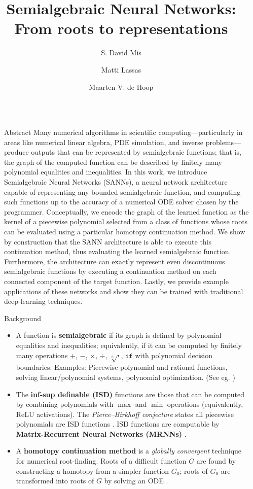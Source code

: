\documentclass[final]{beamer}
\title{Semialgebraic Neural Networks: From roots to representations}
\author{S. David Mis \inst{1} \and Matti Lassas \inst{2} \and Maarten V. de Hoop \inst{1}}
\institute[shortinst]{\inst{1} Rice University \samelineand \inst{2} University of Helsinki}
\newlength{\sepwidth}
\newlength{\lrcolwidth}
\newcommand{\separatorcolumn}{\begin{column}{\sepwidth}\end{column}}
\begin{document}
\begin{frame}[t]
\begin{columns}[t]
\separatorcolumn

\begin{column}{\lrcolwidth}

  \begin{exampleblock}{Abstract}
    Many numerical algorithms in scientific computing---particularly in areas like numerical linear algebra, PDE simulation, and inverse problems---produce outputs that can be represented by semialgebraic functions; that is, the graph of the computed function can be described by finitely many polynomial equalities and inequalities. 
    In this work, we introduce Semialgebraic Neural Networks (SANNs), a neural network architecture capable of representing any bounded semialgebraic function, and computing such functions up to the accuracy of a numerical ODE solver chosen by the programmer.
    Conceptually, we encode the graph of the learned function as the kernel of a piecewise polynomial selected from a class of functions whose roots can be evaluated using a particular homotopy continuation method.
    We show by construction that the SANN architecture is able to execute this continuation method, thus evaluating the learned semialgebraic function.
    Furthermore, the architecture can exactly represent even discontinuous semialgebraic functions by executing a continuation method on each connected component of the target function.
    Lastly, we provide example applications of these networks and show they can be trained with traditional deep-learning techniques.
  \end{exampleblock}

  \begin{block}{Background}
    \begin{itemize}
      \item A function is \textbf{semialgebraic} if its graph is defined by polynomial equalities and inequalities; equivalently, if it can be computed by finitely many operations $+$, $-$, $\times$, $\div$, $\sqrt[n]{\cdot}$, $\texttt{if}$ with polynomial decision boundaries. Examples: Piecewise polynomial and rational functions, solving linear/polynomial systems, polynomial optimization. (See eg. \cite{bochnakRealAlgebraicGeometry1998})
      \item The \textbf{inf-sup definable (ISD)} functions are those that can be computed by combining polynomials with $\max$ and $\min$ operations (equivalently, ReLU activations). The \emph{Pierce--Birkhoff conjecture} states all piecewise polynomials are ISD functions \cite{mahePierceBirkhoffConjecture1984}. ISD functions are computable by \textbf{Matrix-Recurrent Neural Networks (MRNNs)} \cite{dehoopDeepLearningArchitectures2022}.
      \item A \textbf{homotopy continuation method} is a \emph{globally convergent} technique for numerical root-finding. Roots of a difficult function $G$ are found by constructing a homotopy from a simpler function $G_0$; roots of $G_0$ are transformed into roots of $G$ by solving an ODE \cite{chenHomotopyContinuationMethod2015}.
    \end{itemize}
  \end{block}


\end{column}
\end{columns}
\end{frame}
\end{document}
